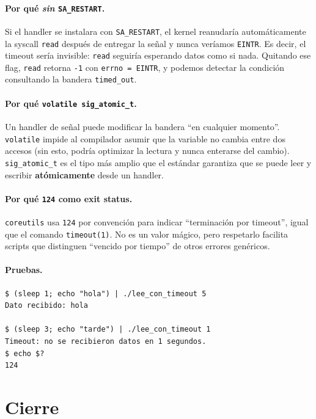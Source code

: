 \documentclass[11pt,a4paper]{article}
\begin{document}
\paragraph{Por qué \emph{sin} \texttt{SA\_RESTART}.}
Si el handler se instalara con \texttt{SA\_RESTART}, el kernel
reanudaría automáticamente la syscall \texttt{read} después de
entregar la señal y nunca veríamos \texttt{EINTR}. Es decir, el
timeout sería invisible: \texttt{read} seguiría esperando datos como
si nada. Quitando ese flag, \texttt{read} retorna \texttt{-1} con
\texttt{errno = EINTR}, y podemos detectar la condición consultando
la bandera \texttt{timed\_out}.

\paragraph{Por qué \texttt{volatile sig\_atomic\_t}.}
Un handler de señal puede modificar la bandera ``en cualquier
momento''. \texttt{volatile} impide al compilador asumir que la
variable no cambia entre dos accesos (sin esto, podría optimizar la
lectura y nunca enterarse del cambio). \texttt{sig\_atomic\_t} es el
tipo más amplio que el estándar garantiza que se puede leer y escribir
\textbf{atómicamente} desde un handler.

\paragraph{Por qué \texttt{124} como exit status.}
\texttt{coreutils} usa \texttt{124} por convención para indicar
``terminación por timeout'', igual que el comando \texttt{timeout(1)}.
No es un valor mágico, pero respetarlo facilita scripts que distinguen
``vencido por tiempo'' de otros errores genéricos.

\paragraph{Pruebas.}

\begin{lstlisting}[style=outstyle]
$ (sleep 1; echo "hola") | ./lee_con_timeout 5
Dato recibido: hola

$ (sleep 3; echo "tarde") | ./lee_con_timeout 1
Timeout: no se recibieron datos en 1 segundos.
$ echo $?
124
\end{lstlisting}

\section*{Cierre}
\end{document}
